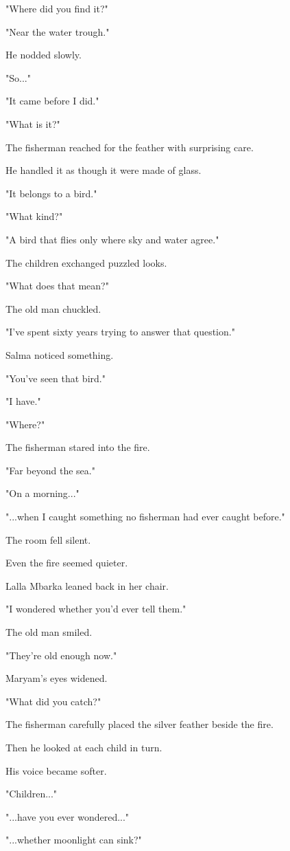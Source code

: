 \documentclass[12pt,openany]{book}
\begin{document}
"Where did you find it?"

"Near the water trough."

He nodded slowly.

"So..."

"It came before I did."

"What is it?"

The fisherman reached for the feather with surprising care.

He handled it as though it were made of glass.

"It belongs to a bird."

"What kind?"

"A bird that flies only where sky and water agree."

The children exchanged puzzled looks.

"What does that mean?"

The old man chuckled.

"I've spent sixty years trying to answer that question."

Salma noticed something.

"You've seen that bird."

"I have."

"Where?"

The fisherman stared into the fire.

"Far beyond the sea."

"On a morning..."

"...when I caught something no fisherman had ever caught before."

The room fell silent.

Even the fire seemed quieter.

Lalla Mbarka leaned back in her chair.

"I wondered whether you'd ever tell them."

The old man smiled.

"They're old enough now."

Maryam's eyes widened.

"What did you catch?"

The fisherman carefully placed the silver feather beside the fire.

Then he looked at each child in turn.

His voice became softer.

"Children..."

"...have you ever wondered..."

"...whether moonlight can sink?"
\end{document}
